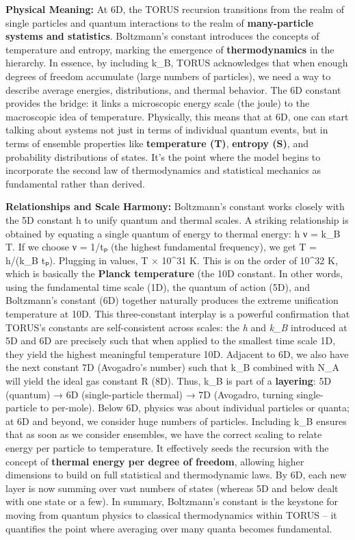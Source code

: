 \documentclass[
]{article}
\begin{document}
\textbf{Physical Meaning:} At 6D, the TORUS recursion transitions from
the realm of single particles and quantum interactions to the realm of
\textbf{many-particle systems and statistics}. Boltzmann's constant
introduces the concepts of temperature and entropy, marking the
emergence of \textbf{thermodynamics} in the hierarchy\hspace{0pt}. In
essence, by including k\_B, TORUS acknowledges that when enough degrees
of freedom accumulate (large numbers of particles), we need a way to
describe average energies, distributions, and thermal behavior. The 6D
constant provides the bridge: it links a microscopic energy scale (the
joule) to the macroscopic idea of temperature. Physically, this means
that at 6D, one can start talking about systems not just in terms of
individual quantum events, but in terms of ensemble properties like
\textbf{temperature (T)}, \textbf{entropy (S)}, and probability
distributions of states. It's the point where the model begins to
incorporate the second law of thermodynamics and statistical mechanics
as fundamental rather than derived.

\textbf{Relationships and Scale Harmony:} Boltzmann's constant works
closely with the 5D constant h to unify quantum and thermal scales. A
striking relationship is obtained by equating a single quantum of energy
to thermal energy: h ν = k\_B T. If we choose ν = 1/tₚ (the highest
fundamental frequency), we get T = h/(k\_B tₚ). Plugging in values, T  × 10\^{}31 K\hspace{0pt}. This is on the order of 10\^{}32 K, which
is basically the \textbf{Planck temperature} (the 10D constant. In other
words, using the fundamental time scale (1D), the quantum of action
(5D), and Boltzmann's constant (6D) together naturally produces the
extreme unification temperature at 10D. This three-constant interplay is
a powerful confirmation that TORUS's constants are self-consistent
across scales: the \emph{h} and \emph{k\_B} introduced at 5D and 6D are
precisely such that when applied to the smallest time scale 1D, they
yield the highest meaningful temperature 10D\hspace{0pt}. Adjacent to
6D, we also have the next constant 7D (Avogadro's number) such that k\_B
combined with N\_A will yield the ideal gas constant R (8D)\hspace{0pt}.
Thus, k\_B is part of a \textbf{layering}: 5D (quantum) → 6D
(single-particle thermal) → 7D (Avogadro, turning single-particle to
per-mole). Below 6D, physics was about individual particles or quanta;
at 6D and beyond, we consider huge numbers of particles. Including k\_B
ensures that as soon as we consider ensembles, we have the correct
scaling to relate energy per particle to temperature. It effectively
seeds the recursion with the concept of \textbf{thermal energy per
degree of freedom}, allowing higher dimensions to build on full
statistical and thermodynamic laws. By 6D, each new layer is now summing
over vast numbers of states (whereas 5D and below dealt with one state
or a few). In summary, Boltzmann's constant is the keystone for moving
from quantum physics to classical thermodynamics within TORUS -- it
quantifies the point where averaging over many quanta becomes
fundamental.
\end{document}
